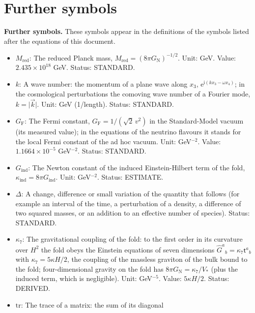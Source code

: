 \documentclass[
  10pt,
]{article}
\providecommand{\tightlist}{%
  \setlength{\itemsep}{0pt}\setlength{\parskip}{0pt}}
\begin{document}
\hypertarget{further-symbols}{%
\section{Further symbols}\label{further-symbols}}

\textbf{Further symbols.} These symbols appear in the definitions of the
symbols listed after the equations of this document.

\begin{itemize}
\tightlist
\item
  \(M_{\mathrm{red}}\): The reduced Planck mass,
  \(M_{\mathrm{red}} = (8\pi G_{\mathrm{N}})^{-1/2}\). Unit: GeV. Value:
  \(2.435\times10^{18}\) GeV. Status: STANDARD.
\item
  \(k\): A wave number: the momentum of a plane wave along \(x_3\),
  \(\mathrm{e}^{\mathrm{i}(kx_3 - \omega x_4)}\); in the cosmological
  perturbations the comoving wave number of a Fourier mode,
  \(k = \lvert\vec k\rvert\). Unit: GeV (1/length). Status: STANDARD.
\item
  \(G_{\mathrm{F}}\): The Fermi constant,
  \(G_{\mathrm{F}} = 1/(\sqrt2\,v^2)\) in the Standard-Model vacuum (its
  measured value); in the equations of the neutrino flavours it stands
  for the local Fermi constant of the ad hoc vacuum. Unit: GeV\(^{-2}\).
  Value: \(1.1664\times10^{-5}\) GeV\(^{-2}\). Status: STANDARD.
\item
  \(G_{\mathrm{ind}}\): The Newton constant of the induced
  Einstein-Hilbert term of the fold,
  \(\kappa_{\mathrm{ind}} = 8\pi G_{\mathrm{ind}}\). Unit: GeV\(^{-2}\).
  Status: ESTIMATE.
\item
  \(\Delta\): A change, difference or small variation of the quantity
  that follows (for example an interval of the time, a perturbation of a
  density, a difference of two squared masses, or an addition to an
  effective number of species). Status: STANDARD.
\item
  \(\kappa_7\): The gravitational coupling of the fold: to the first
  order in its curvature over \(H^2\) the fold obeys the Einstein
  equations of seven dimensions
  \(\hat G^a{}_b = \kappa_7\mathsf{t}^a{}_b\) with
  \(\kappa_7 = 5\kappa H/2\), the coupling of the massless graviton of
  the bulk bound to the fold; four-dimensional gravity on the fold has
  \(8\pi G_{\mathrm{N}} = \kappa_7/V_*\) (plus the induced term, which
  is negligible). Unit: GeV\(^{-5}\). Value: \(5\kappa H/2\). Status:
  DERIVED.
\item
  \(\mathrm{tr}\): The trace of a matrix: the sum of its diagonal

\end{itemize}
\end{document}
